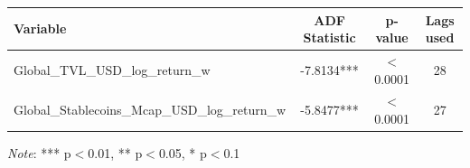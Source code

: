 \begin{tabular}{lccc}
  \toprule
  \textbf{Variable} & \textbf{ADF Statistic} & \textbf{p-value} & \textbf{Lags used} \\ 
  \midrule
  Global\_TVL\_USD\_log\_return\_w & -7.8134*** & $<$0.0001 & 28 \\ 
  Global\_Stablecoins\_Mcap\_USD\_log\_return\_w & -5.8477*** & $<$0.0001 & 27 \\ 
  \bottomrule
\end{tabular}
\par\vspace{4pt}
\begin{minipage}{\linewidth}
  \footnotesize \textit{Note}: *** p$<$0.01, ** p$<$0.05, * p$<$0.1
\end{minipage}